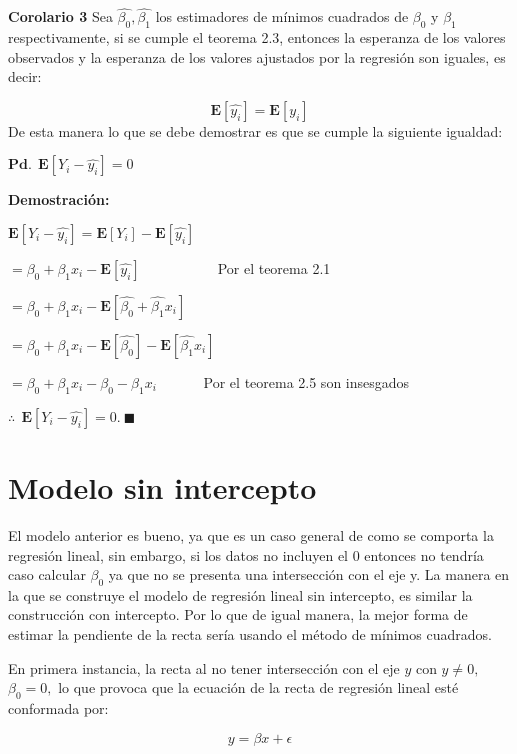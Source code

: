 \documentclass[
  a4paper,
  oneside,
  openany]{book}
\begin{document}
\textbf{Corolario 3} Sea \(\hat{\beta_{0}},\hat{\beta_{1}}\) los estimadores de mínimos cuadrados de \(\beta_{0}\) y \(\beta_{1}\) respectivamente, si se cumple el teorema 2.3, entonces la esperanza de los valores observados y la esperanza de los valores ajustados por la regresión son iguales, es decir:

\[\mathbf{E}\left[\hat{y_{i}}\right]=\mathbf{E}\left[ y_{i} \right]\]
De esta manera lo que se debe demostrar es que se cumple la siguiente igualdad:

\(\mathbf{Pd.} \ \ \mathbf{E}\left[ Y_{i}-\hat{y_{i}}\right]=0\)

\textbf{Demostración:}

\(\mathbf{E}\left[ Y_{i}-\hat{y_{i}}\right]=\mathbf{E}\left[ Y_{i}\right]-\mathbf{E}\left[\hat{y_{i}}\right]\)

\(=\beta_{0}+\beta_{1}x_{i}-\mathbf{E}\left[\hat{y_{i}}\right]\) ~~~ ~~~ ~~~Por el teorema 2.1

\(=\beta_{0}+\beta_{1}x_{i}-\mathbf{E}\left[ \hat{\beta_{0}}+\hat{\beta_{1}}x_{i}\right]\)

\(=\beta_{0}+\beta_{1}x_{i}-\mathbf{E}\left[ \hat{\beta_{0}}\right]-\mathbf{E}\left[\hat{\beta_{1}}x_{i}\right]\)

\(=\beta_{0}+\beta_{1}x_{i}-\beta_{0}-\beta_{1}x_{i}\) ~~~~~~Por el teorema 2.5 son insesgados

\(\therefore \ \ \mathbf{E}\left[ Y_{i}-\hat{y_{i}}\right]=0.\  \blacksquare\)

\hypertarget{modelo-sin-intercepto}{%
\chapter{Modelo sin intercepto}\label{modelo-sin-intercepto}}

El modelo anterior es bueno, ya que es un caso general de como se comporta la regresión lineal, sin embargo, si los datos no incluyen el 0 entonces no tendría caso calcular \(\beta_{0}\) ya que no se presenta una intersección con el eje y.
La manera en la que se construye el modelo de regresión lineal sin intercepto, es similar la construcción con intercepto. Por lo que de igual manera, la mejor forma de estimar la pendiente de la recta sería usando el método de mínimos cuadrados.

En primera instancia, la recta al no tener intersección con el eje \(y\) con \(y \neq 0,\) \(\beta_{0}=0,\) lo que provoca que la ecuación de la recta de regresión lineal esté conformada por:

\[y=\beta x + \epsilon\]
\end{document}
